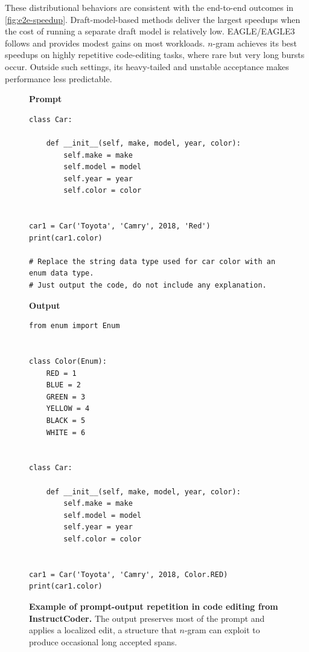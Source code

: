 \documentclass{article}
\begin{document}
These distributional behaviors are consistent with the end-to-end outcomes in \autoref{fig:e2e-speedup}. Draft-model-based methods deliver the largest speedups when the cost of running a separate draft model is relatively low. EAGLE/EAGLE3 follows and provides modest gains on most workloads. $n$-gram achieves its best speedups on highly repetitive code-editing tasks, where rare but very long bursts occur. Outside such settings, its heavy-tailed and unstable acceptance makes performance less predictable.




\begin{figure}[t]
\centering
\lstset{style=codebox, language=Python}

\begin{minipage}[t]{0.485\textwidth}
\textbf{Prompt}
\begin{lstlisting}
class Car:

    def __init__(self, make, model, year, color):
        self.make = make
        self.model = model
        self.year = year
        self.color = color


car1 = Car('Toyota', 'Camry', 2018, 'Red')
print(car1.color)

# Replace the string data type used for car color with an enum data type. 
# Just output the code, do not include any explanation.
\end{lstlisting}
\end{minipage}\hfill
\begin{minipage}[t]{0.485\textwidth}
\textbf{Output}
\begin{lstlisting}
from enum import Enum


class Color(Enum):
    RED = 1
    BLUE = 2
    GREEN = 3
    YELLOW = 4
    BLACK = 5
    WHITE = 6


class Car:

    def __init__(self, make, model, year, color):
        self.make = make
        self.model = model
        self.year = year
        self.color = color


car1 = Car('Toyota', 'Camry', 2018, Color.RED)
print(car1.color)
\end{lstlisting}
\end{minipage}

\vspace{-0.4em}
\caption{\textbf{Example of prompt-output repetition in code editing from InstructCoder.} The output preserves most of the prompt and applies a localized edit, a structure that $n$-gram can exploit to produce occasional long accepted spans.}
\label{fig:ngram_prompt_output_full}
\vspace{-1.0em}
\end{figure}
\end{document}

